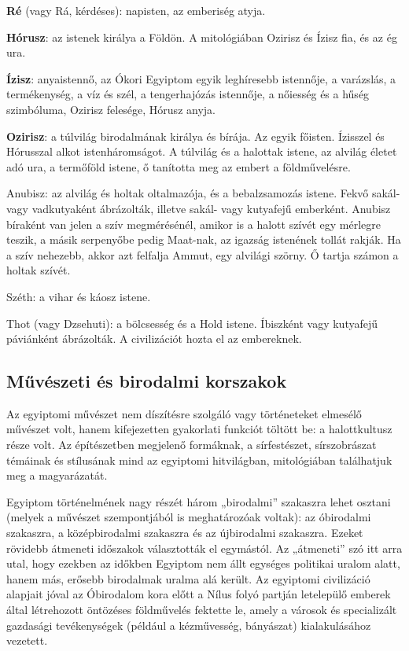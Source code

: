 \begin{compactitem}
	\item \textbf{Ré} (vagy Rá, kérdéses): napisten, az emberiség atyja.
	\item \textbf{Hórusz}: az istenek királya a Földön. A mitológiában Ozirisz és Ízisz fia, és az ég ura.
	\item \textbf{Ízisz}: anyaistennő, az Ókori Egyiptom egyik leghíresebb istennője, a varázslás, a termékenység, a víz és szél, a tengerhajózás istennője, a nőiesség és a hűség szimbóluma, Ozirisz felesége, Hórusz anyja.
	\item \textbf{Ozirisz}: a túlvilág birodalmának királya és bírája. Az egyik főisten. Ízisszel és Hórusszal alkot istenháromságot. A túlvilág és a halottak istene, az alvilág életet adó ura, a termőföld istene, ő tanította meg az embert a földművelésre.
	\item Anubisz: az alvilág és holtak oltalmazója, és a bebalzsamozás istene. Fekvő sakál- vagy vadkutyaként ábrázolták, illetve sakál- vagy kutyafejű emberként. Anubisz bíraként van jelen a szív megmérésénél, amikor is a halott szívét egy mérlegre teszik, a másik serpenyőbe pedig Maat-nak, az igazság istenének tollát rakják. Ha a szív nehezebb, akkor azt felfalja Ammut, egy alvilági szörny. Ő tartja számon a holtak szívét.
	\item Széth: a vihar és káosz istene.
	\item Thot (vagy Dzsehuti): a bölcsesség és a Hold istene. Íbiszként vagy kutyafejű páviánként ábrázolták. A civilizációt hozta el az embereknek.
\end{compactitem}

\subsection*{Művészeti és birodalmi korszakok}

	Az egyiptomi művészet nem díszítésre szolgáló vagy történeteket elmesélő művészet volt, hanem kifejezetten gyakorlati funkciót töltött be: a halottkultusz része volt. Az építészetben megjelenő formáknak, a sírfestészet, sírszobrászat témáinak és stílusának mind az egyiptomi hitvilágban, mitológiában találhatjuk meg a magyarázatát.

Egyiptom történelmének nagy részét három „birodalmi” szakaszra lehet osztani (melyek a művészet szempontjából is meghatározóak voltak): az óbirodalmi szakaszra, a középbirodalmi szakaszra és az újbirodalmi szakaszra. Ezeket rövidebb átmeneti időszakok választották el egymástól. Az „átmeneti” szó itt arra utal, hogy ezekben az időkben Egyiptom nem állt egységes politikai uralom alatt, hanem más, erősebb birodalmak uralma alá került. Az egyiptomi civilizáció alapjait jóval az Óbirodalom kora előtt a Nílus folyó partján letelepülő emberek által létrehozott öntözéses földművelés fektette le, amely a városok és specializált gazdasági tevékenységek (például a kézművesség, bányászat) kialakulásához vezetett.

